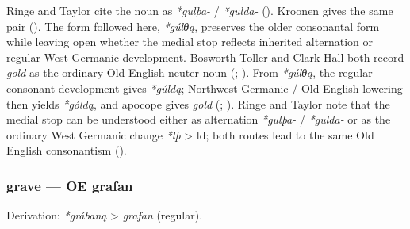 \documentclass[
  british,
  a4paper,
]{article}
\begin{document}
Ringe and Taylor cite the noun as \emph{*gulþa-} / \emph{*gulda-}
(). Kroonen
gives the same pair (). The
form followed here, \emph{*gúlθą}, preserves the older consonantal form
while leaving open whether the medial stop reflects inherited
alternation or regular West Germanic development. Bosworth-Toller and
Clark Hall both record \emph{gold} as the ordinary Old English neuter
noun (;
). From \emph{*gúlθą},
the regular consonant development gives \emph{*gúldą}; Northwest
Germanic / Old English lowering then yields \emph{*góldą}, and apocope
gives \emph{gold} (; ). Ringe
and Taylor note that the medial stop can be understood either as
alternation \emph{*gulþa-} / \emph{*gulda-} or as the ordinary West
Germanic change \emph{*lþ} \textgreater{} ld; both routes lead to the
same Old English consonantism ().

\subsubsection{grave --- OE grafan}\label{grave-oe-grafan}

Derivation: \emph{*grábaną} \textgreater{} \emph{grafan} (regular).

\begingroup
\setlength{\fboxsep}{6pt}
\end{document}
